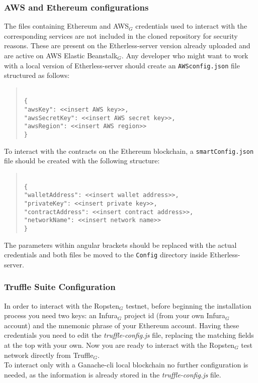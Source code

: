 \subsubsection{AWS and Ethereum configurations}
The files containing Ethereum and AWS$_{G}$ credentials used to interact with the corresponding services are not included in the cloned repository for security reasons. These are present on the Etherless-server version already uploaded and are active on AWS Elastic Beanstalk$_{G}$.
Any developer who might want to work with a local version of Etherless-server should create an \texttt{AWSconfig.json} file structured as follows:
\begin{quote}
\texttt{ \\
	\{\\
		"awsKey": <<insert AWS key>>, \\
		"awsSecretKey": <<insert AWS secret key>>, \\
		"awsRegion": <<insert AWS region>> \\
	\}\\
}
\pagebreak
\end{quote}
To interact with the contracts on the Ethereum blockchain, a \texttt{smartConfig.json} file should be created with the following structure:
\begin{quote}
\texttt{ \\
	\{\\
	"walletAddress": <<insert wallet address>>, \\
	"privateKey": <<insert private key>>, \\
	"contractAddress": <<insert contract address>>, \\
	"networkName": <<insert network name>> \\
	\}\\
}
\end{quote}
The parameters within angular brackets should be replaced with the actual credentials and both files be moved to the \texttt{Config} directory inside Etherless-server.
\subsubsection{Truffle Suite Configuration}
	In order to interact with the Ropsten$_{G}$ testnet, before beginning the installation process you need two keys: an Infura$_{G}$ project id (from your own Infura$_{G}$ account) and the mnemonic phrase of your Ethereum account. Having these credentials you need to edit the \textit{truffle-config.js} file, replacing the matching fields at the top with your own. Now you are ready to interact with the Ropsten$_{G}$ test network directly from Truffle$_{G}$.\\
	To interact only with a Ganache-cli local blockchain no further configuration is needed, as the information is already stored in the \textit{truffle-config.js} file.
